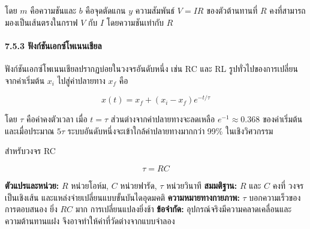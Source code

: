 โดย $m$ คือความชันและ $b$ คือจุดตัดแกน $y$ ความสัมพันธ์ $V=IR$ ของตัวต้านทานที่ $R$ คงที่สามารถมองเป็นเส้นตรงในกราฟ $V$ กับ $I$ โดยความชันเท่ากับ $R$

\paragraph{7.5.3 ฟังก์ชันเอกซ์โพเนนเชียล}

ฟังก์ชันเอกซ์โพเนนเชียลปรากฏบ่อยในวงจรอันดับหนึ่ง เช่น RC และ RL รูปทั่วไปของการเปลี่ยนจากค่าเริ่มต้น $x_i$ ไปสู่ค่าปลายทาง $x_f$ คือ

\[
x(t)=x_f+(x_i-x_f)e^{-t/\tau}
\]

โดย $\tau$ คือค่าคงตัวเวลา เมื่อ $t=\tau$ ส่วนต่างจากค่าปลายทางจะลดเหลือ $e^{-1}\approx0.368$ ของค่าเริ่มต้น และเมื่อประมาณ $5\tau$ ระบบอันดับหนึ่งจะเข้าใกล้ค่าปลายทางมากกว่า 99\% ในเชิงวิศวกรรม

สำหรับวงจร RC

\[
\tau=RC
\]

\textbf{ตัวแปรและหน่วย:} $R$ หน่วยโอห์ม, $C$ หน่วยฟารัด, $\tau$ หน่วยวินาที
\textbf{สมมติฐาน:} $R$ และ $C$ คงที่ วงจรเป็นเชิงเส้น และแหล่งจ่ายเปลี่ยนแบบขั้นบันไดอุดมคติ
\textbf{ความหมายทางกายภาพ:} $\tau$ บอกความเร็วของการตอบสนอง ยิ่ง $RC$ มาก การเปลี่ยนแปลงยิ่งช้า
\textbf{ข้อจำกัด:} อุปกรณ์จริงมีความคลาดเคลื่อนและความต้านทานแฝง จึงอาจทำให้ค่าที่วัดต่างจากแบบจำลอง


